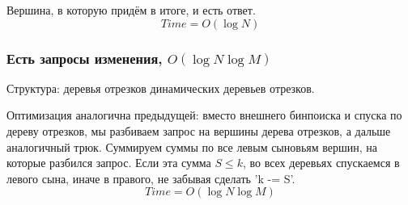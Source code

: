 Вершина, в которую придём в итоге, и есть ответ.
\[ Time = O(\log N) \]

\subsubsection{Есть запросы изменения, $O(\log N \log M)$}

Структура: деревья отрезков динамических деревьев отрезков.

Оптимизация аналогична предыдущей: вместо внешнего бинпоиска и спуска по дереву отрезков, мы разбиваем запрос на вершины дерева отрезков, а дальше аналогичный трюк.
Суммируем суммы по все левым сыновьям вершин, на которые разбился запрос.
Если эта сумма $S \le k$, во всех деревьях спускаемся в левого сына, иначе в правого, не забывая сделать \cpp'k -= S'.
\[ Time = O(\log N \log M) \]
